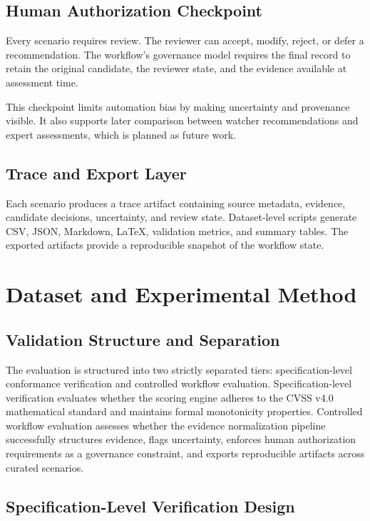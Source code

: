 \documentclass[conference]{IEEEtran}
\begin{document}
\subsection{Human Authorization Checkpoint}

Every scenario requires review. The reviewer can accept, modify, reject, or
defer a recommendation. The workflow's governance model requires the final
record to retain the original candidate, the reviewer state, and the evidence
available at assessment time.

This checkpoint limits automation bias by making uncertainty and provenance visible.
It also supports later comparison between watcher recommendations and expert
assessments, which is planned as future work.

\subsection{Trace and Export Layer}

Each scenario produces a trace artifact containing source metadata, evidence,
candidate decisions, uncertainty, and review state. Dataset-level scripts
generate CSV, JSON, Markdown, LaTeX, validation metrics, and summary tables.
The exported artifacts provide a reproducible snapshot of the workflow state.

\section{Dataset and Experimental Method}

\subsection{Validation Structure and Separation}

The evaluation is structured into two strictly separated tiers:
specification-level conformance verification and controlled workflow evaluation.
Specification-level verification evaluates whether the scoring engine adheres to the
CVSS v4.0 mathematical standard and maintains formal monotonicity properties.
Controlled workflow evaluation assesses whether the evidence normalization pipeline successfully
structures evidence, flags uncertainty, enforces human authorization requirements as a governance constraint, and exports
reproducible artifacts across curated scenarios.

\subsection{Specification-Level Verification Design}
\end{document}
